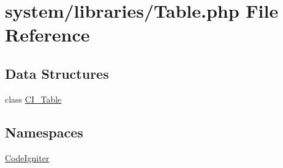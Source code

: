 \hypertarget{_table_8php}{\section{system/libraries/\-Table.php File Reference}
\label{_table_8php}
}
\subsection*{Data Structures}
\begin{DoxyCompactItemize}
\item 
class \hyperlink{class_c_i___table}{C\-I\-\_\-\-Table}
\end{DoxyCompactItemize}
\subsection*{Namespaces}
\begin{DoxyCompactItemize}
\item 
\hyperlink{namespace_code_igniter}{Code\-Igniter}
\end{DoxyCompactItemize}
